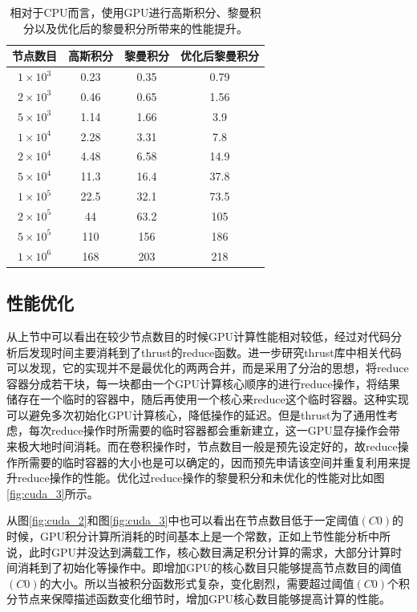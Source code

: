 \begin{table}
    \centering
    \begin{tabular*}{0.8\textwidth}{@{\extracolsep{\fill}}cccc}
        \hline
        \hline							
        节点数目	&	高斯积分	&	黎曼积分	&	优化后黎曼积分	\\\hline
        $1\times10^3$	&	0.23	&	0.35	&	0.79	\\
        $2\times10^3$	&	0.46	&	0.65	&	1.56	\\
        $5\times10^3$	&	1.14	&	1.66	&	3.9	\\
        $1\times10^4$	&	2.28	&	3.31	&	7.8	\\
        $2\times10^4$	&	4.48	&	6.58	&	14.9	\\
        $5\times10^4$	&	11.3	&	16.4	&	37.8	\\
        $1\times10^5$	&	22.5	&	32.1	&	73.5	\\
        $2\times10^5$	&	44	&	63.2	&	105	\\
        $5\times10^5$	&	110	&	156	&	186	\\
        $1\times10^6$	&	168	&	203	&	218	\\
        \hline
        \hline
    \end{tabular*}
    \caption{相对于CPU而言，使用GPU进行高斯积分、黎曼积分以及优化后的黎曼积分所带来的性能提升。}
    \label{tab:cuda_2}
\end{table}


\subsection{性能优化}

从上节中可以看出在较少节点数目的时候GPU计算性能相对较低，经过对代码分析后发现时间主要消耗到了thrust的reduce函数。进一步研究thrust库中相关代码可以发现，它的实现并不是最优化的两两合并，而是采用了分治的思想，将reduce容器分成若干块，每一块都由一个GPU计算核心顺序的进行reduce操作，将结果储存在一个临时的容器中，随后再使用一个核心来reduce这个临时容器。这种实现可以避免多次初始化GPU计算核心，降低操作的延迟。但是thrust为了通用性考虑，每次reduce操作时所需要的临时容器都会重新建立，这一GPU显存操作会带来极大地时间消耗。而在卷积操作时，节点数目一般是预先设定好的，故reduce操作所需要的临时容器的大小也是可以确定的，因而预先申请该空间并重复利用来提升reduce操作的性能。优化过reduce操作的黎曼积分和未优化的性能对比如图\ref{fig:cuda_3}所示。

从图\ref{fig:cuda_2}和图\ref{fig:cuda_3}中也可以看出在节点数目低于一定阈值$(C0)$的时候，GPU积分计算所消耗的时间基本上是一个常数，正如上节性能分析中所说，此时GPU并没达到满载工作，核心数目满足积分计算的需求，大部分计算时间消耗到了初始化等操作中。即增加GPU的核心数目只能够提高节点数目的阈值$(C0)$的大小。所以当被积分函数形式复杂，变化剧烈，需要超过阈值$(C0)$个积分节点来保障描述函数变化细节时，增加GPU核心数目能够提高计算的性能。 

